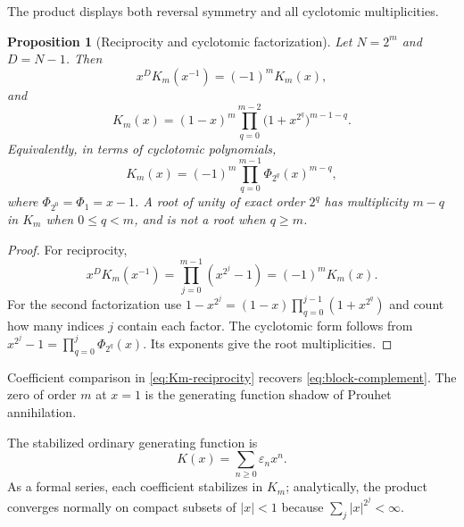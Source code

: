 \documentclass[11pt,oneside]{article}
\newtheorem{proposition}[theorem]{Proposition}
\theoremstyle{definition}
\theoremstyle{remark}
\begin{document}
The product displays both reversal symmetry and all cyclotomic multiplicities.

\begin{proposition}[Reciprocity and cyclotomic factorization]
\label{prop:cyclotomic-factorization}
Let $N=2^m$ and $D=N-1$.  Then
\begin{equation}
  x^D K_m(x^{-1})=(-1)^mK_m(x),                             \label{eq:Km-reciprocity}
\end{equation}
and
\begin{equation}
  K_m(x)=(1-x)^m
  \prod_{q=0}^{m-2}\bigl(1+x^{2^q}\bigr)^{m-1-q}.          \label{eq:Km-cyclotomic}
\end{equation}
Equivalently, in terms of cyclotomic polynomials,
\begin{equation}
  K_m(x)=(-1)^m\prod_{q=0}^{m-1}
             \Phi_{2^q}(x)^{m-q},                          \label{eq:Km-Phi}
\end{equation}
where $\Phi_{2^0}=\Phi_1=x-1$.  A root of unity of exact order $2^q$ has
multiplicity $m-q$ in $K_m$ when $0\le q<m$, and is not a root when $q\ge m$.
\end{proposition}

\begin{proof}
For reciprocity,
\[
 x^D K_m(x^{-1})
 =\prod_{j=0}^{m-1}(x^{2^j}-1)=(-1)^mK_m(x).
\]
For the second factorization use
$1-x^{2^j}=(1-x)\prod_{q=0}^{j-1}(1+x^{2^q})$ and count how many indices
$j$ contain each factor.  The cyclotomic form follows from
$x^{2^j}-1=\prod_{q=0}^{j}\Phi_{2^q}(x)$.  Its exponents give the root
multiplicities.
\end{proof}

Coefficient comparison in \eqref{eq:Km-reciprocity} recovers
\eqref{eq:block-complement}.  The zero of order $m$ at $x=1$ is the generating
function shadow of Prouhet annihilation.

The stabilized ordinary generating function is
\begin{equation}
  K(x)=\sum_{n\ge0}\varepsilon_nx^n.                        \label{eq:K-infinite-definition}
\end{equation}
As a formal series, each coefficient stabilizes in $K_m$; analytically, the
product converges normally on compact subsets of $|x|<1$ because
$\sum_j|x|^{2^j}<\infty$.
\end{document}
